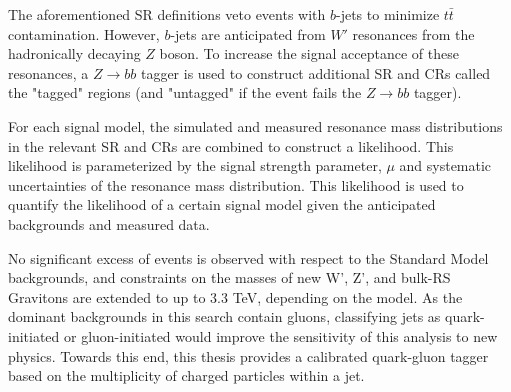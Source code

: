 The aforementioned SR definitions veto events with $b$-jets to minimize $t\bar{t}$ contamination. However, $b$-jets are anticipated from $W'$ resonances from the hadronically decaying $Z$ boson. To increase the signal acceptance of these resonances, a $Z\rightarrow bb$ tagger is used to construct additional SR and CRs called the "tagged" regions (and "untagged" if the event fails the $Z\rightarrow bb$ tagger). 

For each signal model, the simulated and measured resonance mass distributions in the relevant SR and CRs are combined to construct a likelihood. This likelihood is parameterized by the signal strength parameter, $\mu$ and systematic uncertainties of the resonance mass distribution. This likelihood is used to quantify the likelihood of a certain signal model given the anticipated backgrounds and measured data.

No significant excess of events is observed with respect to the Standard Model backgrounds, and constraints on the masses of new W', Z', and bulk-RS Gravitons are extended to up to 3.3 TeV, depending on the model. As the dominant backgrounds in this search contain gluons, classifying jets as quark-initiated or gluon-initiated would improve the sensitivity of this analysis to new physics. Towards this end, this thesis provides a calibrated quark-gluon tagger based on the multiplicity of charged particles within a jet.